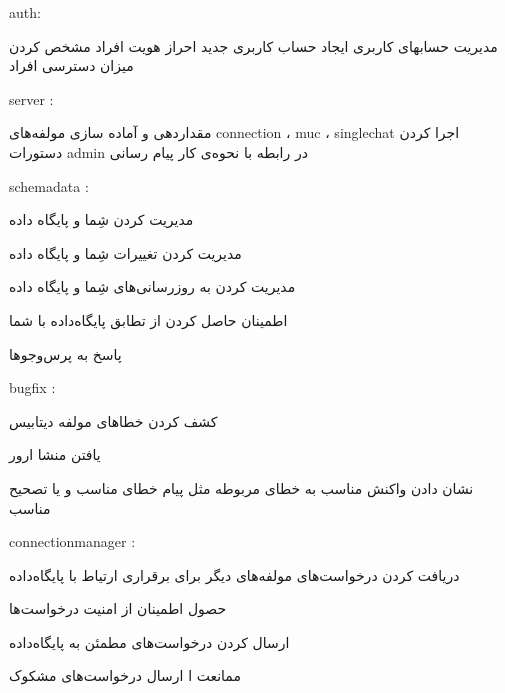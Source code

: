 \begin{itemize}
 auth: 
\begin{itemize}
 مدیریت حسابهای کاربری
 ایجاد حساب کاربری جدید
 احراز هویت افراد
 مشخص کردن میزان دسترسی افراد
\end{itemize}
 server :
\begin{itemize}
 مقداردهی و آماده سازی مولفه‌های connection ، muc ، singlechat
 اجرا کردن دستورات admin در رابطه با نحوه‌ی کار پیام رسانی
\end{itemize}
\end{itemize}



\begin{itemize}	

	 schemadata : 

	\begin{itemize}	

			مدیریت کردن شِما و پایگاه داده

			مدیریت  کردن تغییرات  شِما و پایگاه داده

			مدیریت  کردن به روزرسانی‌های شِما و پایگاه داده

		 	اطمینان حاصل کردن از تطابق پایگاه‌داده با شما 

			پاسخ به پرس‌وجوها

		

	\end{itemize}

	 bugfix :

	\begin{itemize}	

		

		 کشف کردن خطاهای مولفه دیتابیس

		 یافتن منشا ارور

	    نشان دادن واکنش مناسب به خطای مربوطه مثل پیام خطای مناسب و یا تصحیح مناسب

		

	\end{itemize}

	 connectionmanager :

	\begin{itemize}

	    دریافت کردن درخواست‌های مولفه‌های دیگر برای برقراری ارتیاط با پایگاه‌داده

		 حصول اطمینان از امنیت درخواست‌ها

		 ارسال کردن درخواست‌های مطمئن به پایگاه‌داده

		 ممانعت ا ارسال درخواست‌های مشکوک


\end{itemize}
\end{itemize}
